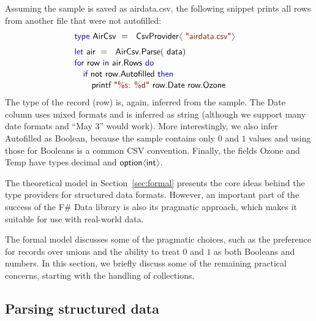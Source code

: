 \documentclass[10pt,preprint,blind,clearpagebib]{sigplanconf}
\newcommand{\langl}{\begin{picture}(4.5,7)
\put(1.1,2.5){\rotatebox{60}{\line(1,0){5.5}}}
\put(1.1,2.5){\rotatebox{300}{\line(1,0){5.5}}}
\end{picture}}
\newcommand{\rangl}{\begin{picture}(4.5,7)
\put(.9,2.5){\rotatebox{120}{\line(1,0){5.5}}}
\put(.9,2.5){\rotatebox{240}{\line(1,0){5.5}}}
\end{picture}}
\newcommand{\kvd}[1]{\textnormal{\textcolor{kvdclr}{\sffamily #1}}}
\newcommand{\str}[1]{\textnormal{\textcolor{strclr}{\sffamily "#1"}}}
\newcommand{\strf}[1]{\textnormal{\textcolor{strclr}{\sffamily #1}}}
\newcommand{\ident}[1]{\textnormal{\sffamily #1}}
\begin{document}
Assuming the sample is saved as \strf{airdata.csv}, the following snippet prints all
rows from another file that were not autofilled:
%
\begin{equation*}
\begin{array}{l}
 \kvd{type}~\ident{AirCsv}~=~\ident{CsvProvider}\langl\str{airdata.csv}\rangl\hspace{1em} \\[0.6em]
 \kvd{let}~\ident{air}~=~\ident{AirCsv.Parse}(\ident{data})\\[0.1em]
 \kvd{for}~\ident{row}~\kvd{in}~\ident{air.Rows}~\kvd{do}\\[0.1em]
 \quad\kvd{if}~\ident{not}~\ident{row.Autofilled}~\kvd{then}\\[0.1em]
 \quad\quad \ident{printf}~\str{\%s: \%d}~\ident{row.Date row.Ozone}\\
\end{array}
\end{equation*}
%
The type of the record (\ident{row}) is, again, inferred from the sample. The \ident{Date} column
uses mixed formats and is inferred as \ident{string} (although we support many date formats and 
``May 3'' would work). More interestingly, we also infer \ident{Autofilled} as Boolean, because 
the sample contains only $0$ and $1$ values and using those for Booleans is a common CSV convention.
Finally, the fields \ident{Ozone} and \ident{Temp} have types \ident{decimal} and
$\ident{option}\langl\ident{int}\rangl$.

The theoretical model in Section~\ref{sec:formal} presents the core ideas behind the type 
providers for structured data formats. However, an important part of the success of the F\# Data
library is also its pragmatic approach, which makes it suitable for use with real-world data.

The formal model discusses some of the pragmatic choices, such as the preference for records over 
unions and the ability to treat $0$ and $1$ as both Booleans and numbers. In this section, we briefly
discuss some of the remaining practical concerns, starting with the handling of collections.


\subsection{Parsing structured data}
\label{sec:impl-parsing}
\end{document}

